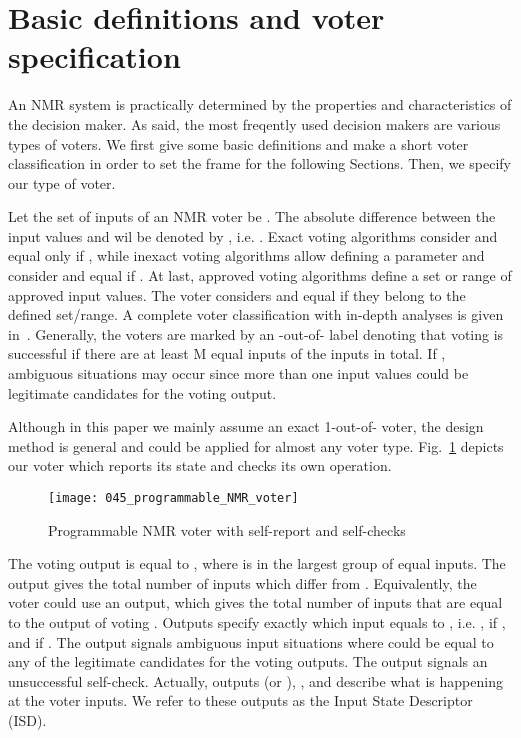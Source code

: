\documentclass[technote, a4paper, onecolumn]{IEEEtran}  \newcommand{\avtor}{Aleksandar Simevski}
\begin{document}
\section{Basic definitions and voter specification}\label{sec_definitions}

An NMR system is practically determined by the properties and characteristics of the decision maker. As said, the most freqently used decision makers are various types of voters. We first give some basic definitions and make a short voter classification in order to set the frame for the following Sections. Then, we specify our type of voter.

Let the set of inputs of an NMR voter be . The absolute difference between the input values  and  wil be denoted by , i.e. . Exact voting algorithms consider  and  equal only if , while inexact voting algorithms allow defining a  parameter and consider  and  equal if . At last, approved voting algorithms define a set or range of approved input values. The voter considers  and  equal if they belong to the defined set/range. A complete voter classification with in-depth analyses is given in~\cite{Parhami1994}. Generally, the voters are marked by an -out-of- label denoting that voting is successful if there are at least M equal inputs of the  inputs in total. If , ambiguous situations may occur since more than one input values could be legitimate candidates for the voting output.

Although in this paper we mainly assume an exact 1-out-of- voter, the design method is general and could be applied for almost any voter type. Fig.~\ref{fig_voter} depicts our voter which reports its state and checks its own operation.

\begin{figure}[!h]
    \centerline{\texttt{[image: 045\_programmable\_NMR\_voter]}}
    \caption{Programmable NMR voter with self-report and self-checks}
    \label{fig_voter}
\end{figure}

The voting output  is equal to , where  is in the largest group of equal inputs. The  output gives the total number of inputs which differ from . Equivalently, the voter could use an  output, which gives the total number of inputs that are equal to the output of voting . Outputs  specify exactly which input  equals to , i.e. , if , and  if . The  output signals ambiguous input situations where  could be equal to any of the legitimate candidates for the voting outputs. The  output signals an unsuccessful self-check. Actually, outputs  (or ), , and  describe what is happening at the voter inputs. We refer to these outputs as the Input State Descriptor (ISD).
\end{document}
